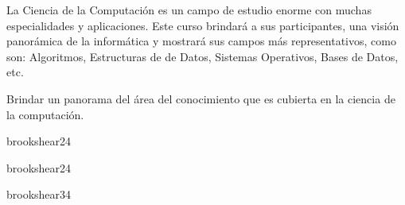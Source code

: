 \begin{syllabus}


\begin{justification}
La Ciencia de la Computación es un campo de estudio enorme con muchas especialidades y aplicaciones. Este curso brindará a sus participantes, una visión panorámica de la informática y mostrará sus campos más representativos, como son: Algoritmos, Estructuras de de Datos, Sistemas Operativos, Bases de Datos, etc.
\end{justification}

\begin{goals}
\item Brindar un panorama del área del conocimiento que es cubierta en la ciencia de la computación.
\end{goals}

\begin{outcomes}
\end{outcomes}

\begin{unit}{\DSBasicLogicDef}{brookshear}{2}{4}
    \DSBasicLogicAllTopics
    \DSBasicLogicAllObjectives
\end{unit}

\begin{unit}{\PFFundamentalConstructsDef}{brookshear}{2}{4}
   \begin{topics}
      \item \PFFundamentalConstructsTopicSyntax
      \item \PFFundamentalConstructsTopicVariables
      \item \PFFundamentalConstructsTopicStructured
   \end{topics}

   \begin{unitgoals}
      \item \PFFundamentalConstructsObjONE
   \end{unitgoals}
\end{unit}

\begin{unit}{\PFAlgorithmsAndProblemSolvingDef}{brookshear}{3}{4}
    \PFAlgorithmsAndProblemSolvingAllTopics
    \PFAlgorithmsAndProblemSolvingAllObjectives
\end{unit}


\end{syllabus}
